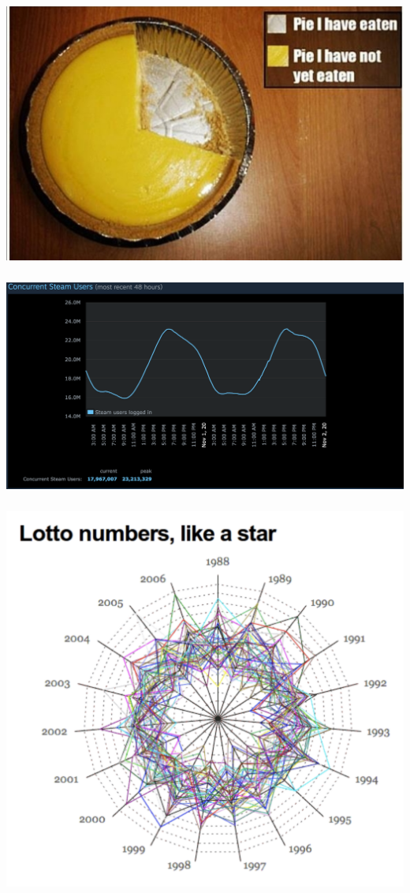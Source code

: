 \documentclass[t, 11pt]{beamer}
\begin{document}
\begin{frame} 
	\frametitle{\insertsection} 
	\begin{center}
		\includegraphics[scale=0.5]{goodpie}
	\end{center}
\end{frame}

\begin{frame} 
	\frametitle{\insertsection} 
	\begin{center}
		\includegraphics[scale=0.3]{goodsteam}
	\end{center}
\end{frame}

\begin{frame} 
	\frametitle{\insertsection} 
	\begin{center}
		\includegraphics[scale=0.4]{messy_plot}
	\end{center}
\end{frame}
\end{document}
